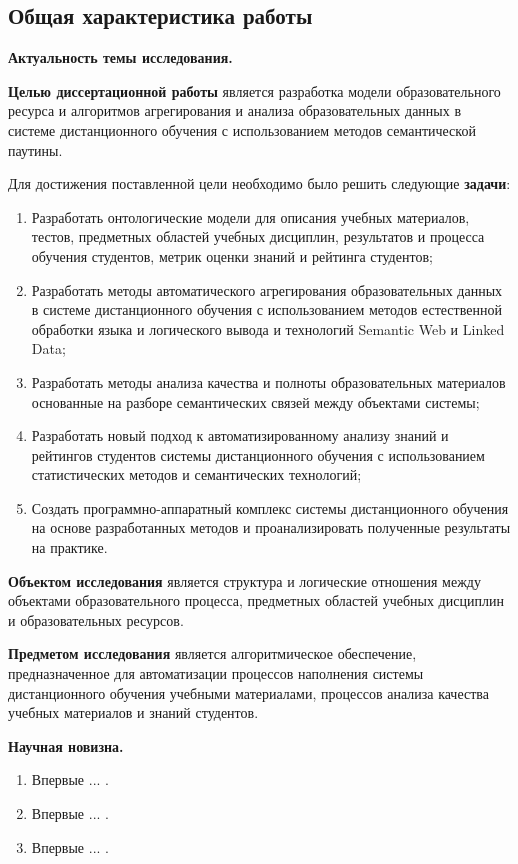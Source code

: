 \subsection*{\Large Общая характеристика работы}
\fontsize{14pt}{15pt}\selectfont


\textbf{Актуальность темы исследования.}



\textbf{Целью диссертационной работы} является разработка модели образовательного ресурса и алгоритмов агрегирования и анализа образовательных данных в системе дистанционного обучения с использованием методов семантической паутины. 

Для достижения поставленной цели необходимо было решить следующие \textbf{задачи}:
\begin{enumerate}
 \item Разработать онтологические модели для описания учебных материалов, тестов, предметных областей учебных дисциплин, результатов и процесса обучения студентов, метрик оценки знаний и рейтинга студентов;
 \item Разработать методы автоматического агрегирования образовательных данных в системе дистанционного обучения с использованием методов естественной обработки языка и логического вывода и технологий Semantic Web и Linked Data;
 \item Разработать методы анализа качества и полноты образовательных материалов основанные на разборе семантических связей между объектами системы;
  \item Разработать новый подход к автоматизированному анализу знаний и рейтингов студентов системы дистанционного обучения с использованием статистических методов и семантических технологий;
  \item Создать программно-аппаратный комплекс системы дистанционного обучения на основе разработанных методов и проанализировать полученные результаты на практике.  
 \end{enumerate}

\textbf{Объектом исследования} является структура и логические отношения между объектами образовательного процесса, предметных областей учебных дисциплин и образовательных ресурсов.  

\textbf{Предметом исследования} является алгоритмическое обеспечение, предназначенное для автоматизации процессов наполнения системы дистанционного обучения учебными материалами, процессов анализа качества учебных материалов и знаний студентов. 

\textbf{Научная новизна.}
\begin{enumerate}
 \item Впервые ... . 
 \item Впервые ... .
 \item Впервые ... . 
\end{enumerate}

